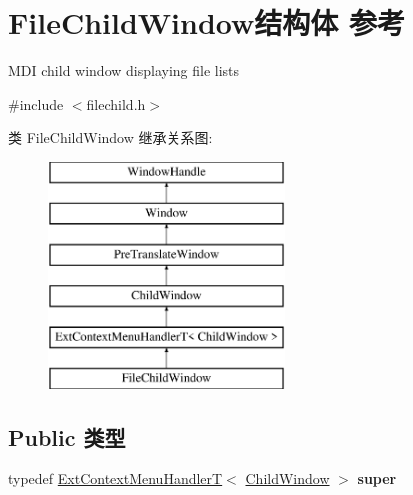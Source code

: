 \hypertarget{struct_file_child_window}{}\section{File\+Child\+Window结构体 参考}
\label{struct_file_child_window}


M\+DI child window displaying file lists  




{\ttfamily \#include $<$filechild.\+h$>$}

类 File\+Child\+Window 继承关系图\+:\begin{figure}[H]
\begin{center}
\leavevmode
\includegraphics[height=6.000000cm]{struct_file_child_window}
\end{center}
\end{figure}
\subsection*{Public 类型}
\begin{DoxyCompactItemize}
\item 
\mbox{\label{struct_file_child_window_a307cefb3c97e08032ae24ee35879426d}} 
typedef \hyperlink{struct_ext_context_menu_handler_t}{Ext\+Context\+Menu\+HandlerT}$<$ \hyperlink{struct_child_window}{Child\+Window} $>$ {\bfseries super}
\end{DoxyCompactItemize}

